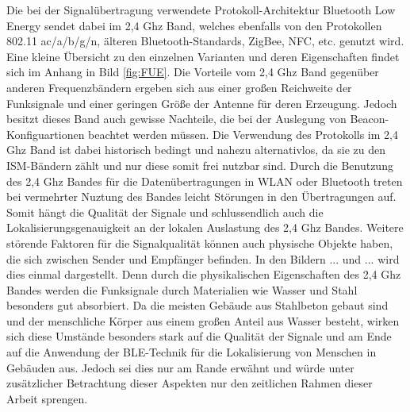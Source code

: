 Die bei der Signalübertragung verwendete Protokoll-Architektur Bluetooth Low Energy sendet dabei im 2,4 Ghz Band, welches ebenfalls von den Protokollen 802.11 ac/a/b/g/n, älteren Bluetooth-Standards, ZigBee, NFC, etc. genutzt wird. Eine kleine Übersicht zu den einzelnen Varianten und deren Eigenschaften findet sich im Anhang in Bild \ref{fig:FUE}. Die Vorteile vom 2,4 Ghz Band gegenüber anderen Frequenzbändern ergeben sich aus einer großen Reichweite der Funksignale und einer geringen Größe der Antenne für deren Erzeugung. Jedoch besitzt dieses Band auch gewisse Nachteile, die bei der Auslegung von Beacon-Konfiguartionen beachtet werden müssen. Die Verwendung des Protokolls im 2,4 Ghz Band ist dabei historisch bedingt und nahezu alternativlos, da sie zu den ISM-Bändern \cite{BuNet} zählt und nur diese somit frei nutzbar sind. Durch die Benutzung des 2,4 Ghz Bandes für die Datenübertragungen in WLAN oder Bluetooth treten bei vermehrter Nuztung des Bandes leicht Störungen in den Übertragungen auf. Somit hängt die Qualität der Signale und schlussendlich auch die Lokalisierungsgenauigkeit an der lokalen Auslastung des 2,4 Ghz Bandes. Weitere störende Faktoren für die Signalqualität  können auch physische Objekte haben, die sich zwischen Sender und Empfänger befinden. In den Bildern ... und ... wird dies einmal dargestellt. Denn durch die physikalischen Eigenschaften des 2,4 Ghz Bandes werden die Funksignale durch Materialien wie Wasser und Stahl besonders gut absorbiert. Da die meisten Gebäude aus Stahlbeton gebaut sind und der menschliche Körper aus einem großen Anteil aus Wasser besteht, wirken sich diese Umstände besonders stark auf die Qualität der Signale und am Ende auf die Anwendung der BLE-Technik für die Lokalisierung von Menschen in Gebäuden aus. Jedoch sei dies nur am Rande erwähnt und würde unter zusätzlicher Betrachtung dieser Aspekten nur den zeitlichen Rahmen dieser Arbeit sprengen. \\ \\
